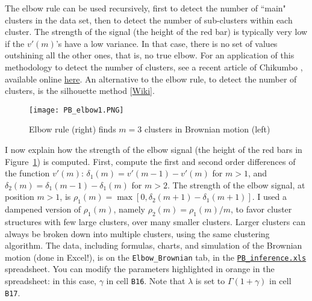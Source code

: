 \documentclass[10pt]{article}
\begin{document}
The elbow rule can be used recursively, first to detect the number of ``main" clusters in the data set, then to detect the number of sub-clusters within each cluster. The strength of the signal (the height of the red bar) is typically very low if the $v'(m)$'s have a low variance. In that case, there is no set of values outshining all the other ones, that is, no true elbow. For an application of this methodology to detect the number of clusters, see a recent article of Chikumbo \cite{vg5}, available online
\href{https://www.mdpi.com/2504-4990/1/2/42}{here}. An alternative to the elbow rule, to detect the number of clusters, 
is the silhouette method [\href{https://en.wikipedia.org/wiki/Silhouette_(clustering)}{Wiki}].

\begin{figure}[H]
\centering
\texttt{[image: PB\_elbow1.PNG]} 
\caption{Elbow rule (right) finds $m = 3$ clusters in Brownian motion (left)}
\label{fig:pbelbow1}
\end{figure}

I now explain how the strength of the elbow signal (the height of the red bars in Figure~\ref{fig:pbelbow1}) is computed. First, compute the first and second order differences of the function $v'(m)$: 
$\delta_1(m)=v'(m-1)-v'(m)$ for $m>1$, and $\delta_2(m)=\delta_1(m-1)-\delta_1(m)$ for $m>2$. The strength of the elbow signal, at position $m>1$, 
is  $\rho_1(m)=\max[0,\delta_2(m+1)-\delta_1(m+1)]$. I used a dampened version of $\rho_1(m)$, namely $\rho_2(m)=\rho_1(m)/m$, to favor cluster
structures with few large clusters, over many smaller clusters. Larger clusters can always be broken down into multiple clusters, using the same clustering algorithm. 
The data, including formulas, charts, and simulation of the Brownian motion (done in Excel!), is on the \texttt{Elbow\_Brownian} tab,
in the \href{https://github.com/VincentGranville/Point-Processes/tree/main/Spreadsheets}{\texttt{PB\_inference.xls}} spreadsheet. You can modify the parameters highlighted in orange in the spreadsheet: in this case, $\gamma$ in cell 
\texttt{B16}. Note that
$\lambda$ is set to $\Gamma(1+\gamma)$ in cell \texttt{B17}. \\

\end{document}
